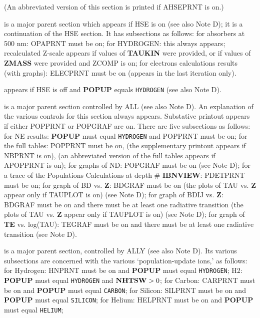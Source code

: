 (An abbreviated version of this section is printed if AHSEPRNT is on.)
\blankline
{} \par
is a major parent section which appears if HSE is on (see also Note D);
it is a continuation of the HSE section. It has subsections as follows:
\bull for absorbers at 500 nm: OPAPRNT must be on;
\bull for HYDROGEN: this always appears;
\bull recalculated Z-scale appears if values of {\bf TAUKIN} were provided,
or if values of {\bf ZMASS} were provided and ZCOMP is on;
\bull for electrons calculations results (with graphs): ELECPRNT must
be on (appears in the last iteration only).
\blankline
{} \par
appears if HSE is off and {\bf POPUP} equals {\tt HYDROGEN} (see also
Note D).
\ej
{} \par
is a major parent section controlled by ALL (see also Note D).
An explanation of the various controls for this section always appears.
Substative printout appears if either
POPPRNT or POPGRAF are on. There are five subsections as follows:
\bull for NE results: {\bf POPUP} must equal {\tt HYDROGEN} and 
POPPRNT must be on;
\bull for the full tables: POPPRNT must be on, (the supplementary
printout appears if NBPRNT is on), (an abbreviated version of the full
tables appears if $\qquad$ \break APOPPRNT is on);
\bull for graphs of ND: POPGRAF must be on (see Note D);
\bull for a trace of the Populations Calculations at depth \# {\bf IBNVIEW}:
\break PDETPRNT must be on;
\bull for graph of BD vs. {\bf Z}: BDGRAF must be on (the plots of TAU
vs. {\bf Z} appear only if TAUPLOT is on) (see Note D);
\bull for graph of BDIJ vs. {\bf Z}: BDGRAF must be on and there must be
at least one radiative transition (the plots of TAU vs. {\bf Z} appear only if
TAUPLOT is on) (see Note D);
\bull for graph of {\bf TE} vs. log(TAU): TEGRAF must be on and there must be
at least one radiative transition (see Note D).
\blankline
{} \par
is a major parent section, controlled by ALLY (see also Note D). Its
various subsections are concerned with the various `population-update ions,'
as follows:
\bull for Hydrogen: HNPRNT must be on and {\bf POPUP} must equal
{\tt HYDROGEN};
\bull H2: {\bf POPUP} must equal {\tt HYDROGEN} and ${\bf NHTSW} > 0$;
\bull for Carbon: CARPRNT must be on and {\bf POPUP} must equal
{\tt CARBON};
\bull for Silicon: SILPRNT must be on and {\bf POPUP} must equal
{\tt SILICON};
\bull for Helium: HELPRNT must be on and {\bf POPUP} must equal
{\tt HELIUM};
